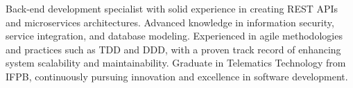\begin{cvletter}
  Back-end development specialist with solid experience in creating REST APIs and microservices architectures. 
  Advanced knowledge in information security, service integration, and database modeling. 
  Experienced in agile methodologies and practices such as TDD and DDD, with a proven track record of enhancing system scalability and maintainability. 
  Graduate in Telematics Technology from IFPB, continuously pursuing innovation and excellence in software development.
  
\end{cvletter}
